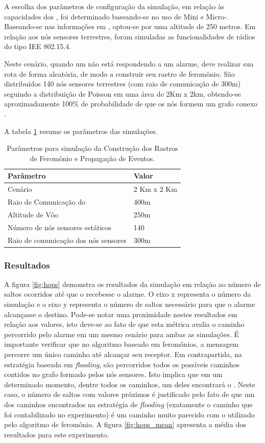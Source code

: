 A escolha dos parâmetros de configuração da simulação, em relação às capacidades dos \vants, foi determinado baseando-se no uso de Mini e Micro-\vants. Baseando-se nas informações em \cite{uas_2009,Storvold2009}, optou-se por uma altitude de 250 metros. Em relação aos nós sensores terrestres, foram simuladas as funcionalidades de rádios do tipo IEE 802.15.4.

Neste cenário, quando um \vant não está respondendo a um alarme, deve realizar sua rota de forma aleatória, de modo a construir seu rastro de feromônio. São distribuídos 140 nós sensores terrestres (com raio de comunicação de 300m) seguindo a distribuição de Poisson em uma área de 2Km x 2km, obtendo-se aproximadamente 100\% de probabilidade de que os nós formem um grafo conexo \cite{Bettstetter2002}.

A tabela \ref{tbl:setup} resume os parâmetros das simulações.

\begin{table}[h!]
\centering
	\begin{tabular}{| l | l |}
		\hline
		Parâmetro & Valor \\
		\hline
		Cenário & 2 Km x 2 Km\\
		Raio de Comunicação do \vant & 400m\\
		Altitude de Vôo & 250m  \\
		Número de nós sensores estáticos & 140  \\
		Raio de comunicação dos nós sensores & 300m \\
		\hline
	\end{tabular}

	\caption{Parâmetros para simulação da Construção dos Rastros de Feromônio e Propagação de Eventos.}
	\label{tbl:setup}
\end{table}


\subsubsection{Resultados}

 A figura \ref{fig:hops} demonstra os resultados da simulação em relação ao número de saltos ocorridos até que o \vant recebesse o alarme. O eixo x representa o número da simulação e o eixo y representa o número de saltos necessário para que o alarme alcançasse o destino. Pode-se notar uma proximidade nestes resultados em relação aos valores, isto deve-se ao fato de que esta métrica avalia o caminho percorrido pelo alarme em um mesmo cenário para ambas as simulações. É importante verificar que no algoritmo baseado em feromônios, a mensagem percorre um único caminho até alcançar seu receptor. Em contrapartida, na estratégia baseada em \emph{flooding}, são percorridos todos os possíveis caminhos contidos no grafo formado pelos nós sensores. Isto implica que em um determinado momento, dentre todos os caminhos, um deles encontrará o \vant. Neste caso, o número de saltos com valores próximos é justificado pelo fato de que um dos caminhos encontrados na estratégia de \emph{flooding} (exatamente o caminho que foi contabilizado no experimento) é um caminho muito parecido com o utilizado pelo algoritmo de feromônio. A figura \ref{fig:hops_mean} apresenta a média dos resultados para este experimento.


